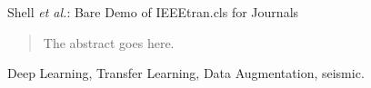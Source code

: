 \documentclass[journal]{IEEEtran}
\begin{document}
%
{Shell \MakeLowercase{\textit{et al.}}: Bare Demo of IEEEtran.cls for Journals}
% 











\maketitle

\begin{abstract}
The abstract goes here.
\end{abstract}

\begin{IEEEkeywords}
Deep Learning, Transfer Learning, Data Augmentation, seismic.
\end{IEEEkeywords}






%
\IEEEpeerreviewmaketitle
\end{document}
